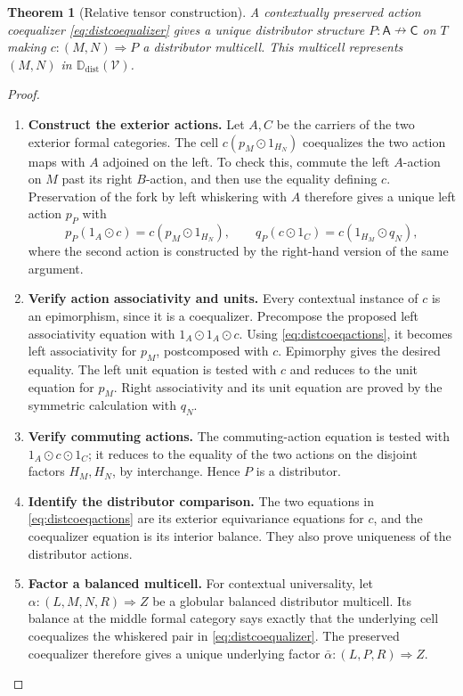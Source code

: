 \documentclass[11pt,reqno]{amsart}
\theoremstyle{plain}
\newtheorem{theorem}{Theorem}[section]
\theoremstyle{definition}
\theoremstyle{remark}
\numberwithin{equation}{section}
\newcommand{\V}{\mathcal V}
\newcommand{\Ddist}{\mathbb D_{\mathrm{dist}}}
\newcommand{\harr}{\mathrel{\nrightarrow}}
\newcommand{\cell}{\mathrel{\Longrightarrow}}
\newcommand{\wh}{\mathbin{\odot}}
\begin{document}
\begin{theorem}[Relative tensor construction]\label{thm:distcoequalizer}
A contextually preserved action coequalizer
\cref{eq:distcoequalizer} gives a unique distributor structure
$P:\mathsf A\harr\mathsf C$ on $T$ making
$c:(M,N)\cell P$ a distributor multicell. This multicell represents
$(M,N)$ in $\Ddist(\V)$.
\end{theorem}
\begin{proof}\leavevmode
\begin{enumerate}
\item \textbf{Construct the exterior actions.} Let $A,C$ be the carriers of the two exterior formal categories. The
cell $c(p_M\wh1_{H_N})$ coequalizes the two action maps with $A$
adjoined on the left. To check this, commute the left $A$-action on
$M$ past its right $B$-action, and then use the equality defining
$c$. Preservation of the fork by left whiskering with $A$ therefore
gives a unique left action $p_P$ with
\begin{equation}\label{eq:distcoeqactions}
 p_P(1_A\wh c)=c(p_M\wh1_{H_N}),\qquad
 q_P(c\wh1_C)=c(1_{H_M}\wh q_N),
\end{equation}
where the second action is constructed by the right-hand version of the
same argument.

\item \textbf{Verify action associativity and units.} Every contextual instance of $c$ is an epimorphism, since it is a
coequalizer. Precompose the proposed left associativity equation with
$1_A\wh1_A\wh c$. Using \cref{eq:distcoeqactions}, it becomes
left associativity for $p_M$, postcomposed with $c$. Epimorphy gives
the desired equality. The left unit equation is tested with $c$ and
reduces to the unit equation for $p_M$. Right associativity and its
unit equation are proved by the symmetric calculation with $q_N$.

\item \textbf{Verify commuting actions.} The commuting-action equation is tested with
$1_A\wh c\wh1_C$; it reduces to the equality of the two actions
on the disjoint factors $H_M,H_N$, by interchange. Hence $P$ is a
distributor.

\item \textbf{Identify the distributor comparison.} The two equations in \eqref{eq:distcoeqactions} are its exterior
equivariance equations for $c$, and the coequalizer equation is its
interior balance. They also prove uniqueness of the distributor actions.

\item \textbf{Factor a balanced multicell.} For contextual universality, let
$\alpha:(L,M,N,R)\cell Z$ be a globular balanced distributor multicell.
Its balance at the middle formal category says exactly that the
underlying cell coequalizes the whiskered pair in
\cref{eq:distcoequalizer}. The preserved coequalizer therefore gives a
unique underlying factor $\bar\alpha:(L,P,R)\cell Z$.


\end{enumerate}
\end{proof}
\end{document}
